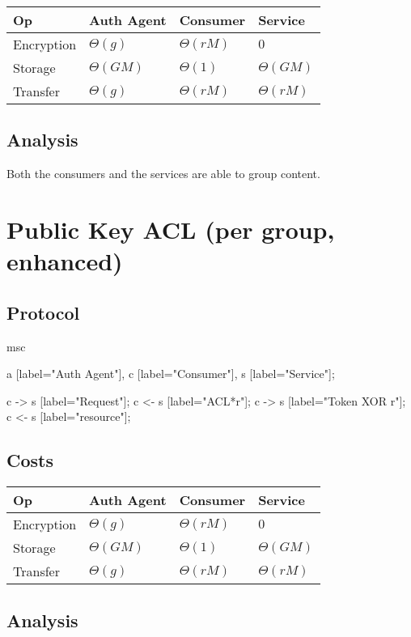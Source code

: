 \documentclass[pdftex,12pt,a4papaer]{article}
\begin{document}
\begin{tabular}{l|l|l|l}
 Op & Auth Agent & Consumer & Service \\ \hline
 Encryption & $\Theta(g)$ & $\Theta(rM)$ & $0$ \\
    Storage & $\Theta(GM)$ & $\Theta(1)$ & $\Theta(GM)$ \\
   Transfer & $\Theta(g)$ & $\Theta(rM)$ & $\Theta(rM)$
\end{tabular}


\subsection{Analysis}

Both the consumers and the services are able to group content.

\pagebreak

\section{Public Key ACL (per group, enhanced)}  %

\subsection{Protocol}

\begin{msc}
msc {
    a [label="Auth Agent"],
    c [label="Consumer"],
    s [label="Service"];

    c -> s [label="Request"];
    c <- s [label="ACL*r"];
    c -> s [label="Token XOR r"];
    c <- s [label="resource"];
}
\end{msc}

\subsection{Costs}

\begin{tabular}{l|l|l|l}
 Op & Auth Agent & Consumer & Service \\ \hline
 Encryption & $\Theta(g)$ & $\Theta(rM)$ & $0$ \\
    Storage & $\Theta(GM)$ & $\Theta(1)$ & $\Theta(GM)$ \\
    Transfer & $\Theta(g)$ & $\Theta(rM)$ & $\Theta(rM)$
\end{tabular}

\subsection{Analysis}
\end{document}
